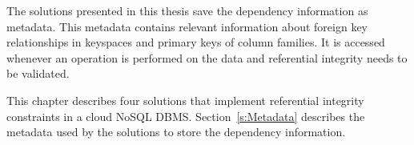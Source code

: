 The solutions presented in this thesis save the dependency information as
metadata. This metadata contains relevant  information about  foreign
key relationships in keyspaces and primary keys of column families. It is
accessed whenever an operation is performed on the data and referential
integrity needs to be validated.


This chapter describes  four  solutions  that implement referential
integrity constraints in a cloud \ac{NoSQL} \ac{DBMS}.
Section~\ref{s:Metadata} describes the metadata used by the solutions 
 to store the dependency information.

